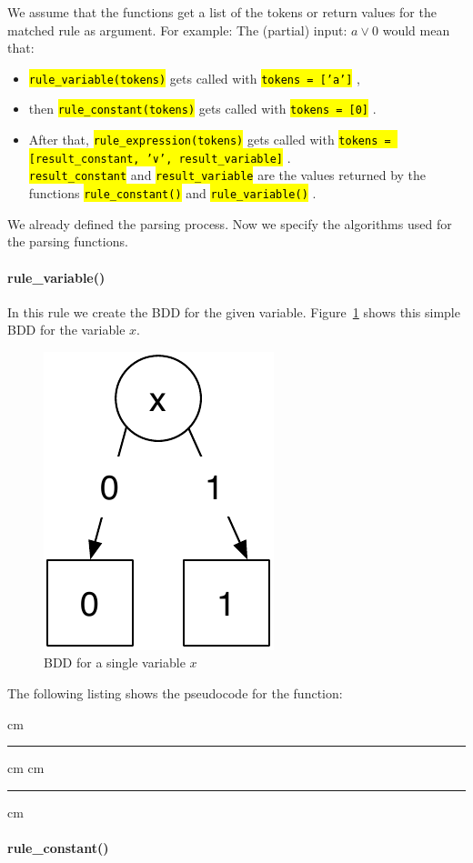 \documentclass[a4paper, 11pt]{article}
\newcommand{\codeinput}[1]
{
    \vskip 0.3 cm
    {\color{lightgray}\hrule}\vskip 0.3 cm
    {\fontsize{9pt}{11pt}}
    \vskip 0.3 cm{\color{lightgray}\hrule}
    \vskip 0.3 cm
}
\newcommand{\code}[1]
{
    \hl{\texttt{#1}}
}
\begin{document}
We assume that the functions get a list of the tokens or return values for the matched rule as argument. For example: The (partial) input: $a ∨ 0$ would mean that:

\begin{flushleft}
\begin{itemize}
    \item \code{rule\_variable(tokens)} gets called with \code{tokens = ['a']},

    \item then \code{rule\_constant(tokens)} gets called with \code{tokens = [0]}.

    \item After that, \code{rule\_expression(tokens)} gets called with \code{tokens = [result\_constant, '∨', result\_variable]}.\\[0.5cm]

    \code{result\_constant} and \code{result\_variable} are the values returned by the functions \code{rule\_constant()} and \code{rule\_variable()}.
\end{itemize}
\end{flushleft}

We already defined the parsing process. Now we specify the algorithms used for the parsing functions.

\paragraph{rule\_variable()}

In this rule we create the BDD for the given variable. Figure~\ref{fig:BDD_Variable} shows this simple BDD for the variable $x$.

\begin{figure}[h]
  \centering
    \includegraphics[width=.2\textwidth]{Figures/BDD Variable.pdf}
  \caption{BDD for a single variable $x$}
  \label{fig:BDD_Variable}
\end{figure}

The following listing shows the pseudocode for the function:

\codeinput{rule_variable}

\paragraph{rule\_constant()}
\end{document}
